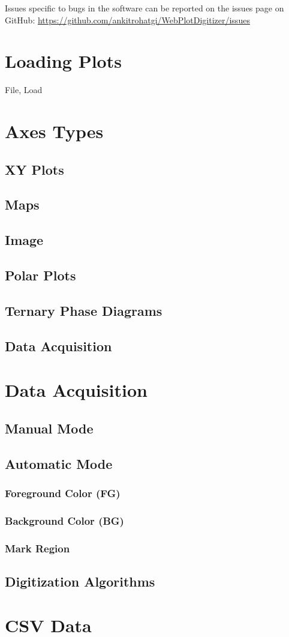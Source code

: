 \documentclass[letterpaper]{article}
\begin{document}
Issues specific to bugs in the software can be reported on the issues page on GitHub: \url{https://github.com/ankitrohatgi/WebPlotDigitizer/issues}

\section{Loading Plots}
File, Load
\section{Axes Types}
\subsection{XY Plots}
\subsection{Maps}
\subsection{Image}
\subsection{Polar Plots}
\subsection{Ternary Phase Diagrams}
\subsection{Data Acquisition}
\section{Data Acquisition}
\subsection{Manual Mode}
\subsection{Automatic Mode}
\subsubsection{Foreground Color (FG)}
\subsubsection{Background Color (BG)}
\subsubsection{Mark Region}
\subsection{Digitization Algorithms}
\section{CSV Data}
\end{document}
